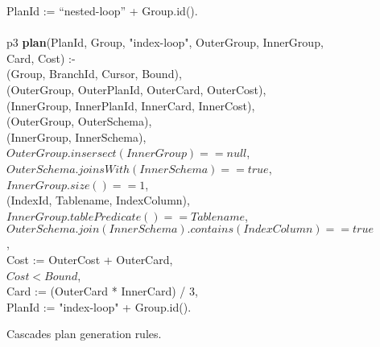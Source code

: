 \begin{figure*}
\begin{boxedminipage}{\linewidth}
\datalogspace PlanId := ``nested-loop'' + Group.id(). \\
\\
p3 {\bf plan}(PlanId, Group, "index-loop", OuterGroup, InnerGroup, Card, Cost) :- \\
(Group, BranchId, Cursor, Bound), \\
(OuterGroup, OuterPlanId, OuterCard, OuterCost), \\
(InnerGroup, InnerPlanId, InnerCard, InnerCost), \\
(OuterGroup, OuterSchema), \\
(InnerGroup, InnerSchema), \\
\datalogspace $OuterGroup.insersect(InnerGroup) ==  null$, \\
\datalogspace $OuterSchema.joinsWith(InnerSchema) ==  true$, \\
\datalogspace $InnerGroup.size() == 1$, \\
(IndexId, Tablename, IndexColumn), \\
\datalogspace $InnerGroup.tablePredicate() == Tablename$, \\
\datalogspace $OuterSchema.join(InnerSchema).contains(IndexColumn) ==  true$, \\
\datalogspace Cost := OuterCost + OuterCard, \\
\datalogspace $Cost < Bound$, \\
\datalogspace Card := (OuterCard * InnerCard) / 3, \\ 
\datalogspace PlanId := "index-loop" + Group.id(). \\
  
\end{boxedminipage}
\caption{\label{ch:evita:fig:cascades_plan} Cascades plan generation rules.}
\end{figure*}

